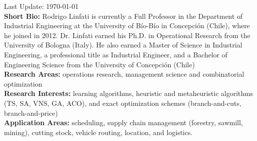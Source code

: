 \makecvtitle
Last Update: \today
~ \\
\textbf{Short Bio:} Rodrigo Linfati is currently a Full Professor in the Department of Industrial Engineering at the University of B\'io-B\'io in Concepci\'on (Chile), where he joined in 2012. Dr. Linfati earned his Ph.D. in Operational Research from the University of Bologna (Italy). He also earned a Master of Science in Industrial Engineering, a professional title as Industrial Engineer, and a Bachelor of Engineering Science from the University of Concepci\'on (Chile)
~ \\
\textbf{Research Areas:} operations research, management science and combinatorial optimization
~ \\
\textbf{Research Interests:} learning algorithms, heuristic and metaheuristic algorithms (TS, SA, VNS, GA, ACO), and exact optimization schemes (branch-and-cuts, branch-and-price)
~ \\
\textbf{Application Areas:} scheduling, supply chain management (forestry, sawmill, mining), cutting stock, vehicle routing, location, and logistics.

\clearpage
